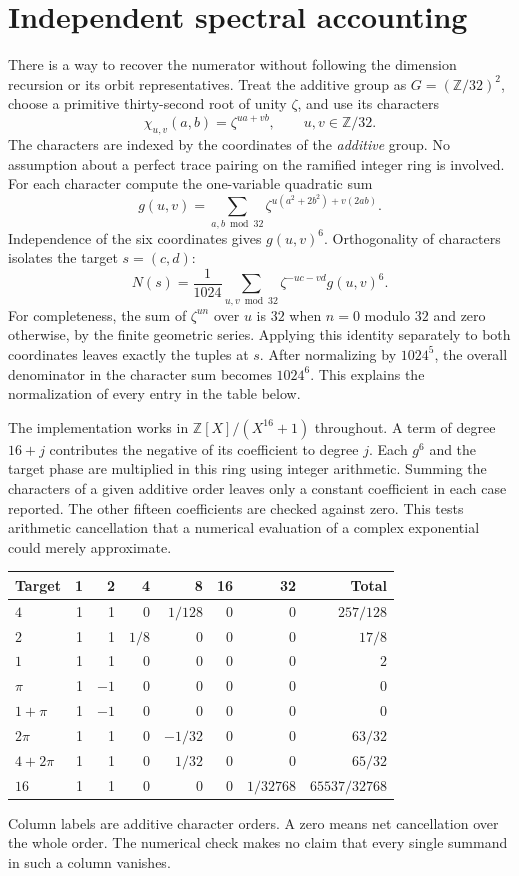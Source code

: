 \documentclass[12pt,letterpaper]{article}
\begin{document}
\section{Independent spectral accounting}
There is a way to recover the numerator without following the dimension recursion or its orbit representatives. Treat the additive group as $G=(\mathbb Z/32)^2$, choose a primitive thirty-second root of unity $\zeta$, and use its characters
\[
     \chi_{u,v}(a,b)=\zeta^{ua+vb},\qquad u,v\in\mathbb Z/32 .
\]
The characters are indexed by the coordinates of the \emph{additive} group. No assumption about a perfect trace pairing on the ramified integer ring is involved. For each character compute the one-variable quadratic sum
\[
 g(u,v)=\sum_{a,b\bmod32}\zeta^{u(a^2+2b^2)+v(2ab)} .
\]
Independence of the six coordinates gives $g(u,v)^6$. Orthogonality of characters isolates the target $s=(c,d)$:
\[
 N(s)=\frac1{1024}\sum_{u,v\bmod32}\zeta^{-uc-vd}g(u,v)^6.
\]
For completeness, the sum of $\zeta^{un}$ over $u$ is $32$ when $n=0$ modulo $32$ and zero otherwise, by the finite geometric series. Applying this identity separately to both coordinates leaves exactly the tuples at $s$. After normalizing by $1024^5$, the overall denominator in the character sum becomes $1024^6$. This explains the normalization of every entry in the table below.
\par
The implementation works in $\mathbb Z[X]/(X^{16}+1)$ throughout. A term of degree $16+j$ contributes the negative of its coefficient to degree $j$. Each $g^6$ and the target phase are multiplied in this ring using integer arithmetic. Summing the characters of a given additive order leaves only a constant coefficient in each case reported. The other fifteen coefficients are checked against zero. This tests arithmetic cancellation that a numerical evaluation of a complex exponential could merely approximate.
\begin{center}\small\begin{tabular}{lrrrrrrr}\toprule
Target&1&2&4&8&16&32&Total\\\midrule
$4$&1&1&0&$1/128$&0&0&$257/128$\\
$2$&1&1&$1/8$&0&0&0&$17/8$\\
$1$&1&1&0&0&0&0&$2$\\
$\pi$&1&$-1$&0&0&0&0&$0$\\
$1+\pi$&1&$-1$&0&0&0&0&$0$\\
$2\pi$&1&1&0&$-1/32$&0&0&$63/32$\\
$4+2\pi$&1&1&0&$1/32$&0&0&$65/32$\\
$16$&1&1&0&0&0&$1/32768$&$65537/32768$\\\bottomrule
\end{tabular}\end{center}
Column labels are additive character orders. A zero means net cancellation over the whole order. The numerical check makes no claim that every single summand in such a column vanishes.
\end{document}

